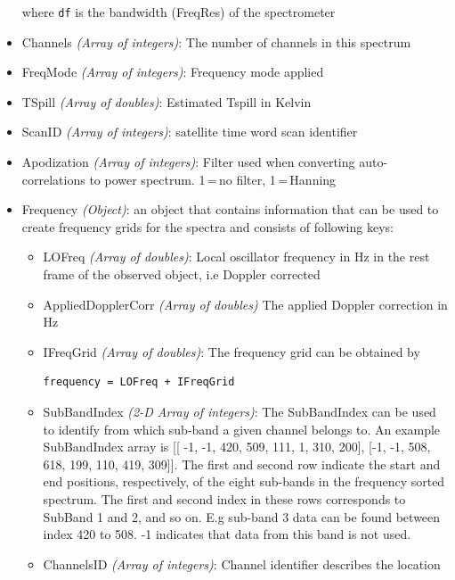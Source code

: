 \begin{itemize}
                         where {\tt df} is the bandwidth (FreqRes) of the spectrometer
  \item Channels \emph{(Array of integers)}: The number of channels in this spectrum
  \item FreqMode \emph{(Array of integers)}: Frequency mode applied
  \item TSpill \emph{(Array of doubles)}: Estimated Tspill in Kelvin
  \item ScanID \emph{(Array of integers)}: satellite time word scan identifier
  \item Apodization \emph{(Array of integers)}: Filter used when converting
    auto-correlations to power spectrum. 1\,=\,no filter, 1\,=\,Hanning 
  \item Frequency \emph{(Object)}: an object that contains information that can be used to create frequency grids for the spectra
                       and consists of following keys: 
  \begin{itemize}             
      \item LOFreq \emph{(Array of doubles)}: Local oscillator frequency in Hz in the rest frame of the
                       observed object, i.e Doppler corrected
      \item AppliedDopplerCorr \emph{(Array of doubles)} The applied Doppler correction in Hz
      \item IFreqGrid \emph{(Array of doubles)}: The frequency grid can be obtained by
                       \begin{verbatim}frequency = LOFreq + IFreqGrid\end{verbatim}
      \item SubBandIndex \emph{(2-D Array of integers)}: The SubBandIndex 
                       can be used to identify from which sub-band a given channel belongs to.
                       An example SubBandIndex array is [[ -1, -1, 420, 509, 111, 1, 310, 200],
                       [-1, -1, 508, 618, 199, 110, 419, 309]].
                       The first and second row indicate the start and end positions, respectively,
                       of the eight sub-bands in the frequency sorted spectrum.
                       The first and second index in these rows corresponds to SubBand 1 and 2, and so
                       on. E.g sub-band 3 data can be found between index 420 to 508.
                       -1 indicates that data from this band is not used.
     \item ChannelsID \emph{(Array of integers)}: Channel identifier describes the location

\end{itemize}
\end{itemize}
